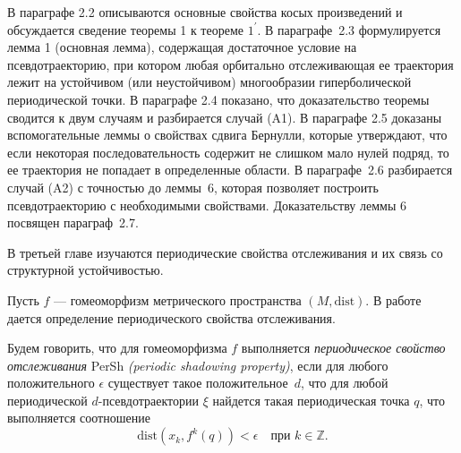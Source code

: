 \documentclass[12pt]{article}
\begin{document}
{В параграфе 2.2 описываются основные свойства косых произведений и обсуждается сведение теоремы 1 к теореме $\mbox{1}^{\prime}$. В параграфе~2.3 фор\-мулируется лемма 1 (основная лемма), содержащая дос\-та\-точ\-ное условие на псевдотраекторию, при котором любая орбитально от\-сле\-живающая ее траектория лежит на устойчивом (или 
неустойчивом) мно\-гообразии гиперболической периодической точки. 
В параграфе 2.4 по\-казано, что доказательство теоремы сводится к двум случаям и разбирается случай (A1).
В параграфе 2.5 доказаны вспомогательные лем\-мы о свойствах сдвига Бернулли, которые утверждают, что если не\-ко\-торая последовательность содержит не слишком мало нулей под\-ряд, то ее траектория не попадает в определенные области. В пара\-г\-ра\-фе~2.6 разбирается случай (A2) с точностью до леммы~6, которая поз\-во\-ля\-ет построить псевдотраекторию с необходимыми свойст\-вами. До\-казательству леммы 6 посвящен параграф~2.7.%

В третьей главе изучаются периодические свойства отслеживания и их связь со структурной устойчивостью. 

Пусть $f$ --- гомеоморфизм метрического пространства $(M,\mbox{dist})$.  
В работе \cite{K} дается определение периодического свой\-ства отслеживания.

Будем говорить, что для гомеоморфизма $f$ выполняется \textit{пе\-ри\-оди\-чес\-кое свойство отслеживания} PerSh \textit{(periodic shadowing property)}, если для любого положительного $\epsilon$ существует такое положительное~$d$, что для любой периодической $d$-псев\-дотраектории $\xi$ найдется такая периодическая точка $q$, что выполняется соотношение %
$$\mbox{dist}(x_k,f^k(q))<\epsilon\quad\mbox{при }k\in\mathbb{Z}.$$
%

}
\end{document}
